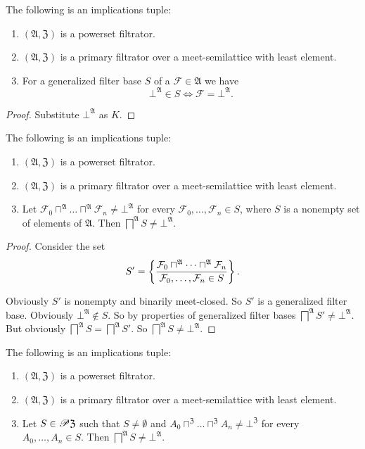 \begin{cor}
\label{genbase-corr}The following is an implications tuple:
\begin{enumerate}
\item $(\mathfrak{A},\mathfrak{Z})$ is a powerset filtrator.
\item $(\mathfrak{A},\mathfrak{Z})$ is a primary filtrator over a meet-semilattice
with least element.
\item For a generalized filter base $S$ of a $\mathcal{F}\in\mathfrak{A}$
we have
\[
\bot^{\mathfrak{A}}\in S\Leftrightarrow\mathcal{F}=\bot^{\mathfrak{A}}.
\]

\end{enumerate}
\end{cor}
\begin{proof}
Substitute $\bot^{\mathfrak{A}}$ as $K$.\end{proof}
\begin{thm}
\label{genbase-f-closed}The following is an implications tuple:
\begin{enumerate}
\item $(\mathfrak{A},\mathfrak{Z})$ is a powerset filtrator.
\item $(\mathfrak{A},\mathfrak{Z})$ is a primary filtrator over a meet-semilattice
with least element.
\item Let $\mathcal{F}_{0}\sqcap^{\mathfrak{A}}\dots\sqcap^{\mathfrak{A}}\mathcal{F}_{n}\ne\bot^{\mathfrak{A}}$
for every $\mathcal{F}_{0},\dots,\mathcal{F}_{n}\in S$, where $S$
is a nonempty set of elements of $\mathfrak{A}$. Then $\bigsqcap^{\mathfrak{A}}S\ne\bot^{\mathfrak{A}}$.
\end{enumerate}
\end{thm}
\begin{proof}
Consider the set
\[
S'=\left\{ \frac{\mathcal{F}_{0}\sqcap^{\mathfrak{A}}\dots\sqcap^{\mathfrak{A}}\mathcal{F}_{n}}{\mathcal{F}_{0},\dots,\mathcal{F}_{n}\in S}\right\}.
\]


Obviously $S'$ is nonempty and binarily meet-closed. So $S'$ is
a generalized filter base. Obviously $\bot^{\mathfrak{A}}\notin S$.
So by properties of generalized filter bases $\bigsqcap^{\mathfrak{A}}S'\ne\bot^{\mathfrak{A}}$.
But obviously $\bigsqcap^{\mathfrak{A}}S=\bigsqcap^{\mathfrak{A}}S'$.
So $\bigsqcap^{\mathfrak{A}}S\ne\bot^{\mathfrak{A}}$.\end{proof}
\begin{cor}
\label{princ-fbase}The following is an implications tuple:
\begin{enumerate}
\item \label{princ-fbase-p}$(\mathfrak{A},\mathfrak{Z})$ is a powerset
filtrator.
\item \label{princ-fbase-fltr}$(\mathfrak{A},\mathfrak{Z})$ is a primary
filtrator over a meet-semilattice with least element.
\item \label{princ-fbase-conc}Let $S\in\mathscr{P}\mathfrak{Z}$ such that
$S\ne\emptyset$ and $A_{0}\sqcap^{\mathfrak{Z}}\dots\sqcap^{\mathfrak{Z}}A_{n}\ne\bot^{\mathfrak{Z}}$
for every $A_{0},\dots,A_{n}\in S$. Then $\bigsqcap^{\mathfrak{A}}S\ne\bot^{\mathfrak{A}}$.
\end{enumerate}
\end{cor}
